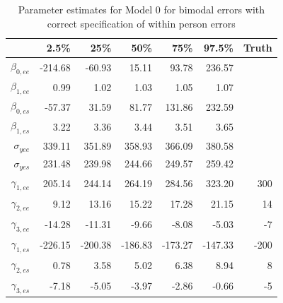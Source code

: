 \documentclass[11pt]{article}\usepackage[]{graphicx}\usepackage[]{color}
\begin{document}
\begin{table}[ht]
\centering
\begin{tabular}{rrrrrr|r}
  \hline
 & 2.5\% & 25\% & 50\% & 75\% & 97.5\% & Truth\\
  \hline
$\beta_{0,ee}$ & -214.68 & -60.93 & 15.11 & 93.78 & 236.57 \\ 
  $\beta_{1,ee}$ & 0.99 & 1.02 & 1.03 & 1.05 & 1.07 \\ 
  $\beta_{0,es}$ & -57.37 & 31.59 & 81.77 & 131.86 & 232.59 \\ 
  $\beta_{1,es}$ & 3.22 & 3.36 & 3.44 & 3.51 & 3.65 \\ 
  $\sigma_{yee}$ & 339.11 & 351.89 & 358.93 & 366.09 & 380.58 \\ 
  $\sigma_{yes}$ & 231.48 & 239.98 & 244.66 & 249.57 & 259.42 \\ 
  $\gamma_{1,ee}$ & 205.14 & 244.14 & 264.19 & 284.56 & 323.20 & 300\\ 
  $\gamma_{2,ee}$ & 9.12 & 13.16 & 15.22 & 17.28 & 21.15 & 14\\ 
  $\gamma_{3,ee}$ & -14.28 & -11.31 & -9.66 & -8.08 & -5.03 & -7\\ 
  $\gamma_{1,es}$ & -226.15 & -200.38 & -186.83 & -173.27 & -147.33 &-200 \\ 
  $\gamma_{2,es}$ & 0.78 & 3.58 & 5.02 & 6.38 & 8.94 & 8\\ 
  $\gamma_{3,es}$ & -7.18 & -5.05 & -3.97 & -2.86 & -0.66 & -5\\ 
   \hline
\end{tabular}
\caption{Parameter estimates for Model 0 for bimodal errors with correct specification of within person errors}
\label{m0bwpestimates}
\end{table}
\end{document}
